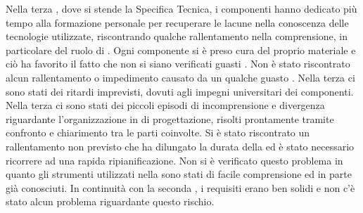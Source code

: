 		Nella terza , dove si stende la Specifica Tecnica, i componenti hanno dedicato più tempo alla formazione personale per recuperare le lacune nella conoscenza delle tecnologie utilizzate, riscontrando qualche rallentamento nella comprensione, in particolare del ruolo di .
		Ogni componente si è preso cura del proprio materiale e ciò ha favorito il fatto che non si siano verificati guasti . Non è stato riscontrato alcun rallentamento o impedimento causato da un qualche guasto .
		Nella terza  ci sono stati dei ritardi imprevisti, dovuti agli impegni universitari dei componenti.
		Nella terza  ci sono stati dei piccoli episodi di incomprensione e divergenza riguardante l’organizzazione in  di progettazione, risolti prontamente tramite confronto e chiarimento tra le parti coinvolte.
		Si è stato riscontrato un rallentamento non previsto che ha dilungato la durata della  ed è stato necessario ricorrere ad una rapida ripianificazione.
		Non si è verificato questo problema in quanto gli strumenti utilizzati nella  sono stati di facile comprensione ed in parte già conosciuti.
		In continuità con la seconda , i requisiti erano ben solidi e non c'è stato alcun problema riguardante questo rischio.


